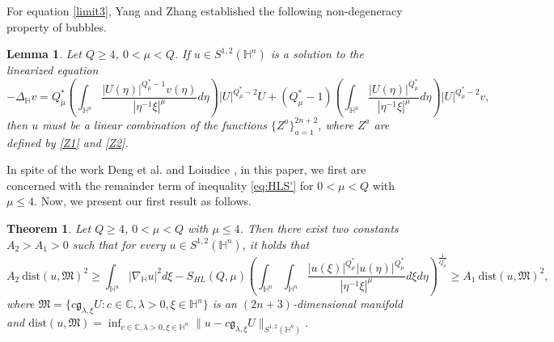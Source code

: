 \documentclass[11pt]{article}
\newtheorem{theorem}{Theorem}[section]
\newtheorem{lemma}{Lemma}[section]
\begin{document}
For equation \eqref{limit3}, Yang and Zhang \cite{YZ251} established
the following non-degeneracy property of bubbles. %
\begin{lemma}\label{nondege}
 Let $Q\geq 4$, $0<\mu< Q$.
 If $u \in S^{1,2}(\mathbb{H}^{n})$ is a solution to
  the linearized equation
  \begin{equation*}
	-\Delta_{\mathbb{H}} v=Q^{\ast}_{\mu}\left(\int_{\mathbb{H}^{n}}\frac{|U(\eta)|^{Q^{\ast}_{\mu}-1}v(\eta)}
{|\eta^{-1}\xi|^{\mu}}{d}\eta\right)|U|^{Q^{\ast}_{\mu}-2}U+(Q^{\ast}_{\mu}-1)
\left(\int_{\mathbb{H}^{n}}\frac{|U(\eta)|^{Q^{\ast}_{\mu}}}{|\eta^{-1}\xi|^{\mu}}{d}\eta\right)
|U|^{Q^{\ast}_{\mu}-2}v,
\end{equation*}
  then $u$ must be a linear combination of the functions  $\{Z^{a}\}_{a=1}^{2n +2}$, where $Z^a$ are defined by \eqref{Z1} and \eqref{Z2}.
\end{lemma}




In spite of the work Deng et al. \cite{DTYZ23} and Loiudice \cite{L05}, in this paper, we first are concerned with the remainder term of inequality \eqref{eq:HLS'} for $0<\mu< Q$ with $\mu\leq 4$.
Now, we present our first result as follows.
\begin{theorem}\label{main thm0}
Let $Q\geq 4$, $0<\mu< Q$ with $\mu\leq 4$.
 Then there exist two constants $A_2>A_1>0$ such that for every $u\in S^{1,2}(\mathbb{H}^{n})$, it holds that
 \begin{equation*}
A_2 ~  \mathrm{dist}(u,\mathfrak{M})^2\geq  \int_{\mathbb{H}^{n}}|\nabla_{\mathbb{H}} u|^{2}{d}\xi-S_{HL}(Q,\mu)	\left(\int_{\mathbb{H}^{n}}\int_{\mathbb{H}^{n}}\frac{|u(\xi)|^{Q^{\ast}_{\mu}}|u(\eta)|
^{Q^{\ast}_{\mu}}}{|\eta^{-1}\xi|^{\mu}}{d}\xi{d}\eta\right)^{\frac{1}{Q^{\ast}_{\mu}}}\geq A_1 ~  \mathrm{dist}(u,\mathfrak{M})^2,
\end{equation*}
where $\mathfrak{M}=\big\{c\mathfrak{g}_{\lambda,\xi}U: c\in \mathbb{C},\lambda>0,\xi\in \mathbb{H}^n\big\}$ is an $(2n+3)$-dimensional manifold and $\mathrm{dist}(u,\mathfrak{M})=\inf_{c\in \mathbb{C},\lambda>0,\xi\in \mathbb{H}^n}\|u-c\mathfrak{g}_{\lambda,\xi}U\|_{S^{1,2}(\mathbb{H}^{n})}$.
\end{theorem}
\end{document}
